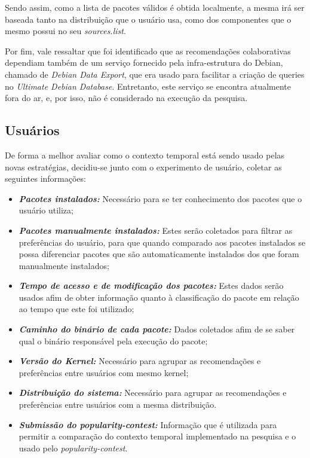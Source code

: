 Sendo assim, como a lista de pacotes válidos é obtida localmente, a mesma irá ser baseada tanto na
distribuição que o usuário usa, como dos componentes que o mesmo possui no seu
\textit{sources.list}.

Por fim, vale ressaltar que foi identificado que as recomendações
colaborativas dependiam também de um serviço fornecido pela infra-estrutura do
Debian, chamado de \textit{Debian Data Export}, que era usado para facilitar a criação de
queries no \textit{Ultimate Debian Database}. Entretanto, este serviço se encontra
atualmente fora do ar, e, por isso, não é considerado na execução da pesquisa.

\subsection{Usuários} \label{sec:coleta_dados_usuario}

De forma a melhor avaliar como o contexto temporal está sendo usado pelas novas
estratégias, decidiu-se junto com o experimento de usuário, coletar as seguintes
informações:

\begin{itemize}
    \item \textit{\textbf{Pacotes instalados:}} Necessário para se ter conhecimento dos pacotes que o usuário utiliza;
    \item \textit{\textbf{Pacotes manualmente instalados:}} Estes serão coletados para filtrar as preferências do usuário, para que quando comparado aos pacotes instalados se possa diferenciar pacotes que são automaticamente instalados dos que foram manualmente instalados;
    \item \textit{\textbf{Tempo de acesso e de modificação dos pacotes:}} Estes dados serão usados afim de obter
        informação quanto à classificação do pacote em relação ao tempo que este foi utilizado;
    \item \textit{\textbf{Caminho do binário de cada pacote:}} Dados coletados afim de se saber qual o binário responsável pela execução do pacote;
    \item \textit{\textbf{Versão do Kernel:}} Necessário para agrupar as recomendações e preferências entre usuários com mesmo kernel;
    \item \textit{\textbf{Distribuição do sistema:}} Necessário para agrupar as recomendações e preferências entre usuários com a mesma distribuição.
    \item \textit{\textbf{Submissão do popularity-contest:}} Informação que é
        utilizada para permitir a comparação do contexto temporal implementado
        na pesquisa e o usado pelo \textit{popularity-contest}.
\end{itemize}

